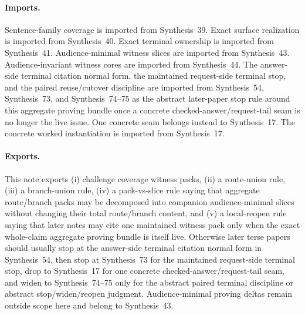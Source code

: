 \documentclass[11pt]{article}
\begin{document}
\paragraph{Imports.}
Sentence-family coverage is imported from Synthesis~39.\cite{series:challengecoverage}
Exact surface realization is imported from Synthesis~40.\cite{series:challengesurfacehooks}
Exact terminal ownership is imported from Synthesis~41.\cite{series:challengeterminalwitnesses}
Audience-minimal witness slices are imported from Synthesis~43.\cite{series:challengecoveragewitnessslices}
Audience-invariant witness cores are imported from Synthesis~44.\cite{series:challengecoveragewitnesscores}
The answer-side terminal citation normal form, the maintained request-side terminal stop, and the paired reuse/cutover discipline are imported from Synthesis~54, Synthesis~73, and Synthesis~74--75 as the abstract later-paper stop rule around this aggregate proving bundle once a concrete checked-answer/request-tail seam is no longer the live issue. One concrete seam belongs instead to Synthesis~17.\cite{series:challengeanswerreviewmenus,series:publicrequestresponsepacketrefreshresponsepacketclosureverdicts,series:pairedterminalcitationdiscipline,series:pairedterminalcutoverrules,series:workedexample}
The concrete worked instantiation is imported from Synthesis~17.\cite{series:workedexample}
\paragraph{Exports.}
This note exports (i) challenge coverage witness packs, (ii) a route-union rule, (iii) a branch-union rule, (iv) a pack-vs-slice rule saying that aggregate route/branch packs may be decomposed into companion audience-minimal slices without changing their total route/branch content, and (v) a local-reopen rule saying that later notes may cite one maintained witness pack only when the exact whole-claim aggregate proving bundle is itself live.
Otherwise later terse papers should usually stop at the answer-side terminal citation normal form in Synthesis~54, then stop at Synthesis~73 for the maintained request-side terminal stop, drop to Synthesis~17 for one concrete checked-answer/request-tail seam, and widen to Synthesis~74--75 only for the abstract paired terminal discipline or abstract stop/widen/reopen judgment. Audience-minimal proving deltas remain outside scope here and belong to Synthesis~43.\cite{series:challengecoveragewitnessslices,series:challengeanswerreviewmenus,series:publicrequestresponsepacketrefreshresponsepacketclosureverdicts,series:pairedterminalcitationdiscipline,series:pairedterminalcutoverrules,series:workedexample}
\end{document}
